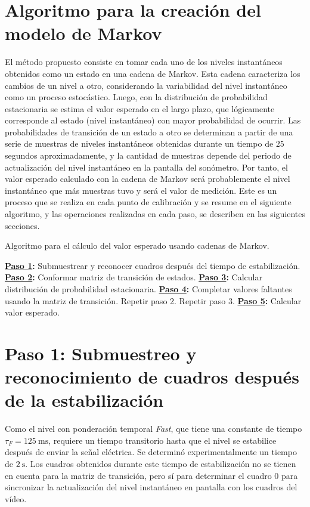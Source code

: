 \section*{Algoritmo para la creación del modelo de Markov}
El método propuesto consiste en tomar cada uno de los niveles instantáneos obtenidos como un estado en una cadena de Markov.
Esta cadena caracteriza los cambios de un nivel a otro, considerando la variabilidad del nivel instantáneo como un proceso estocástico.
Luego, con la distribución de probabilidad estacionaria se estima el valor esperado en el largo plazo, que lógicamente corresponde al estado (nivel instantáneo) con mayor probabilidad de ocurrir.
Las probabilidades de transición de un estado a otro se determinan a partir de una serie de muestras de niveles instantáneos obtenidas durante un tiempo de $25$ segundos aproximadamente, y la cantidad de muestras depende del periodo de actualización del nivel instantáneo en la pantalla del sonómetro.
Por tanto, el valor esperado calculado con la cadena de Markov será probablemente el nivel instantáneo que más muestras tuvo y será el valor de medición.
Este es un proceso que se realiza en cada punto de calibración y se resume en el siguiente algoritmo, y las operaciones realizadas en cada paso, se describen en las siguientes secciones.

\begin{algorithm}[H]
    \caption{Algoritmo para el cálculo del valor esperado usando cadenas de Markov.}
    \label{alg:markov_expected_value}
    \scriptsize
    \DontPrintSemicolon
    \BlankLine
    \textbf{\hyperref[sec:downsampling]{Paso 1}:} Submuestrear y reconocer cuadros después del tiempo de estabilización.\;
    \textbf{\hyperref[subsec:transition_matrix]{Paso 2}:} Conformar matriz de transición de estados.\;
    \textbf{\hyperref[subsec:stationary_distribution]{Paso 3}:} Calcular distribución de probabilidad estacionaria.\;
    \textbf{\hyperref[sec:fill_missing_values]{Paso 4}:} Completar valores faltantes usando la matriz de transición.\;
    Repetir paso 2.\;
    Repetir paso 3.\;
    \textbf{\hyperref[subsec:expected_value]{Paso 5}:} Calcular valor esperado.\;
\end{algorithm}

\section*{Paso 1: Submuestreo y reconocimiento de cuadros después de la estabilización}
\label{sec:downsampling}
Como el nivel con ponderación temporal \emph{Fast}, que tiene una constante de tiempo $\tau_F = \qty{125}{\ms}$, requiere un tiempo transitorio hasta que el nivel se estabilice después de enviar la señal eléctrica.
Se determinó experimentalmente un tiempo de $\qty{2}{\s}$.
Los cuadros obtenidos durante este tiempo de estabilización no se tienen en cuenta para la matriz de transición, pero sí para determinar el cuadro $0$ para sincronizar la actualización del nivel instantáneo en pantalla con los cuadros del vídeo.

